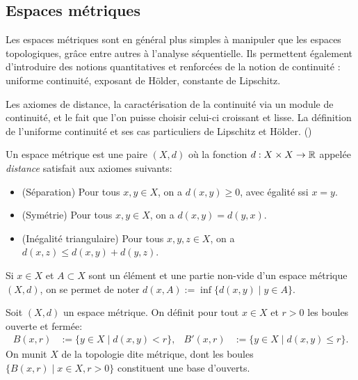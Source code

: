 

\subsection{Espaces métriques}
\label{subsec:metric}

Les espaces métriques sont en général plus simples à manipuler que les espaces topologiques, grâce entre autres à l'analyse séquentielle. Ils permettent également d'introduire des notions quantitatives et renforcées de la notion de continuité : uniforme continuité, exposant de Hölder, constante de Lipschitz.

\begin{retenir}
Les axiomes de distance, la caractérisation de la continuité via un module de continuité, et le fait que l'on puisse choisir celui-ci croissant et lisse. La définition de l'uniforme continuité et ses cas particuliers de Lipschitz et Hölder.
()
\end{retenir}


\begin{definition}
\label{def:distance}
%
	Un espace métrique est une paire $(X,d)$ où la fonction $d : X \times X \to \mathbb{R}$ appelée \emph{distance} satisfait aux axiomes suivants:
	\begin{itemize}
		\item (Séparation) Pour tous $x,y \in X$, on a $d(x,y) \geq 0$, avec égalité ssi $x=y$. 
		\item (Symétrie) Pour tous $x,y \in X$, on a $d(x,y) = d(y,x)$. 
		\item (Inégalité triangulaire) Pour tous $x,y,z \in X$, on a $d(x,z) \leq d(x,y) + d(y,z)$. 
	\end{itemize}
\end{definition}

Si $x\in X$ et $A\subset X$ sont un élément et une partie non-vide d'un espace métrique $(X,d)$, on se permet de noter $d(x,A) := \inf\{d(x,y) \mid y \in A\}$.

\begin{definition}
\label{def:boule}
%
	Soit $(X,d)$ un espace métrique. On définit pour tout $x \in X$ et $r > 0$ les boules ouverte et fermée:
	\begin{align}
		B(x,r) &:= \{y \in X\mid d(x,y) < r\}, &
		B'(x,r) &:= \{y\in X\mid d(x,y) \leq r\}.
	\end{align}
	On munit $X$ de la topologie dite métrique, dont les boules $\{B(x,r) \mid x \in X, r>0\}$ constituent une base d'ouverts.
\end{definition}

